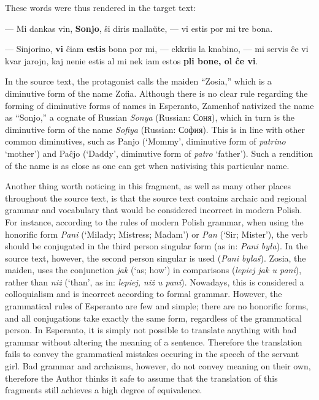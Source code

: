 These words were thus rendered in the target text:

\begin{displayquote}
--- Mi dankas vin, \textbf{Sonjo}, ŝi diris mallaŭte, --- vi estis por mi tre bona.

--- Sinjorino, \textbf{vi} ĉiam \textbf{estis} bona por mi, --- ekkriis la knabino, --- mi servis ĉe vi kvar jarojn, kaj nenie estis al mi nek iam estos \textbf{pli bone, ol ĉe vi}.
\end{displayquote}

In the source text, the protagonist calls the maiden ``Zosia,'' which is a diminutive form of the name Zofia.
Although there is no clear rule regarding the forming of diminutive forms of names in Esperanto, Zamenhof nativized the name as ``Sonjo,'' a cognate of Russian \textit{Sonya} (Russian: Соня), which in turn is the diminutive form of the name \textit{Sofiya} (Russian: София).
This is in line with other common diminutives, such as Panjo (`Mommy', diminutive form of \textit{patrino} `mother') and Pa\^cjo (`Daddy', diminutive form of \textit{patro} `father').
Such a rendition of the name is as close as one can get when nativising this particular name.



Another thing worth noticing in this fragment, as well as many other places throughout the source text, is that the source text contains archaic and regional grammar and vocabulary that would be considered incorrect in modern Polish. %
For instance, according to the rules of modern Polish grammar, when using the honorific form \textit{Pani} (`Milady; Mistress; Madam') or \textit{Pan} (`Sir; Mister'), the verb should be conjugated in the third person singular form (as in: \textit{Pani była}).
In the source text, however, the second person singular is used (\textit{Pani byłaś}).
Zosia, the maiden, uses the conjunction %
\textit{jak} (`as; how') in comparisons (\textit{lepiej jak u pani}), rather than \textit{niż} (`than', as in: \textit{lepiej, niż u pani}).
Nowadays, this is considered a colloquialism and is incorrect according to formal grammar. %
However, the grammatical rules of Esperanto are few and simple; there are no honorific forms, and all conjugations take exactly the same form, regardless of the grammatical person.
In Esperanto, it is simply not possible to translate anything with bad grammar without altering the meaning of a sentence.
Therefore the translation fails to convey the grammatical mistakes occuring in the speech of the servant girl.
Bad grammar and archaisms, however, do not convey meaning on their own, therefore the Author thinks it safe to assume that the translation of this fragments still achieves a high degree of equivalence.


